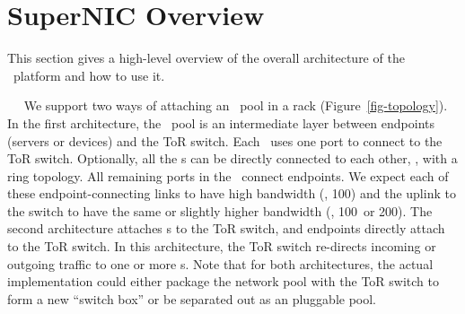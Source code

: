 \section{SuperNIC Overview}
\label{sec:overview}

This section gives a high-level overview of the overall architecture of the \snic\ platform and how to use it. %

~~
We support two ways of attaching an \snic\ pool in a rack (Figure~\ref{fig-topology}).
In the first architecture, the \snic\ pool is an intermediate layer between endpoints (servers or devices) and the ToR switch.
Each \snic\ uses one port to connect to the ToR switch.
Optionally, all the \snic{}s can be directly connected to each other, \eg, with a ring topology.
All remaining ports in the \snic\ connect endpoints.
We expect each of these endpoint-connecting links to have high bandwidth (\eg, 100\Gbps) and the uplink to the switch to have the same or slightly higher bandwidth (\eg, 100\Gbps\ or 200\Gbps). 
%
The second architecture attaches \snic{}s to the ToR switch, and endpoints directly attach to the ToR switch.
In this architecture, the ToR switch re-directs incoming or outgoing traffic to one or more \snic{}s. 
Note that for both architectures, the actual implementation could either package the network pool with the ToR switch to form a new ``switch box'' or be separated out as an pluggable pool. 


